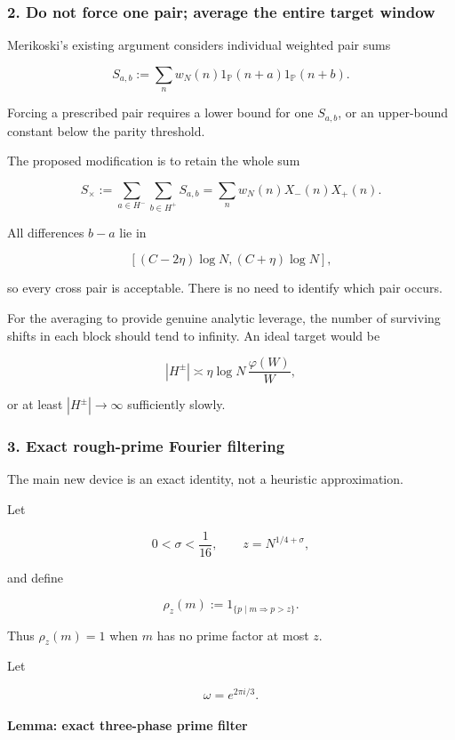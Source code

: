 \medskip
\medskip


\subsubsection*{2. Do not force one pair; average the entire target window}

Merikoski’s existing argument considers individual weighted pair sums

\[
S_{a,b}:=
\sum_n w_N(n)
1_{\mathbb P}(n+a)1_{\mathbb P}(n+b).
\]

Forcing a prescribed pair requires a lower bound for one \(S_{a,b}\), or an upper-bound constant below the parity threshold.

The proposed modification is to retain the whole sum

\[
S_\times
:=
\sum_{a\in H^-}\sum_{b\in H^+}S_{a,b}
=
\sum_n w_N(n)X_-(n)X_+(n).
\tag{5}
\]

All differences \(b-a\) lie in

\[
[(C-2\eta)\log N,(C+\eta)\log N],
\]

so every cross pair is acceptable. There is no need to identify which pair occurs.

For the averaging to provide genuine analytic leverage, the number of surviving shifts in each block should tend to infinity. An ideal target would be

\[
|H^\pm|
\asymp
\eta\log N\,\frac{\varphi(W)}{W},
\]

or at least \(|H^\pm|\to\infty\) sufficiently slowly.

\medskip
\medskip


\subsubsection*{3. Exact rough-prime Fourier filtering}

The main new device is an exact identity, not a heuristic approximation.

Let

\[
0<\sigma<\frac1{16},
\qquad
z=N^{1/4+\sigma},
\]

and define

\[
\rho_z(m):=
1_{\{p\mid m\Rightarrow p>z\}}.
\]

Thus \(\rho_z(m)=1\) when \(m\) has no prime factor at most \(z\).

Let

\[
\omega=e^{2\pi i/3}.
\]

\paragraph{Lemma: exact three-phase prime filter}


